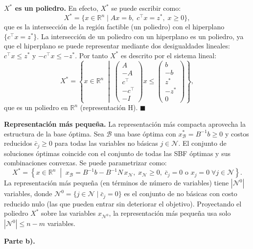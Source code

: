 \documentclass{article}
\begin{document}
\textbf{$X^*$ es un poliedro.} En efecto, $X^*$ se puede escribir como:
\[
X^* = \{x \in \mathbb{R}^n \mid Ax = b,\; c^\top x = z^*,\; x \geq 0\},
\]
que es la intersección de la región factible (un poliedro) con el hiperplano $\{c^\top x = z^*\}$. La intersección de un poliedro con un hiperplano es un poliedro, ya que el hiperplano se puede representar mediante dos desigualdades lineales: $c^\top x \leq z^*$ y $-c^\top x \leq -z^*$. Por tanto $X^*$ es descrito por el sistema lineal:
\[
X^* = \left\{x \in \mathbb{R}^n \;\middle|\; \begin{pmatrix} A \\ -A \\ c^\top \\ -c^\top \\ -I \end{pmatrix} x \leq \begin{pmatrix} b \\ -b \\ z^* \\ -z^* \\ 0 \end{pmatrix}\right\},
\]
que es un poliedro en $\mathbb{R}^n$ (representación H). $\blacksquare$

\textbf{Representación más pequeña.} La representación más compacta aprovecha la estructura de la base óptima. Sea $\mathcal{B}$ una base óptima con $x_\mathcal{B}^* = B^{-1}b \geq 0$ y costos reducidos $\bar{c}_j \geq 0$ para todas las variables no básicas $j \in \mathcal{N}$. El conjunto de soluciones óptimas coincide con el conjunto de todas las SBF óptimas y sus combinaciones convexas. Se puede parametrizar como:
\[
X^* = \left\{x \in \mathbb{R}^n \;\middle|\; x_\mathcal{B} = B^{-1}b - B^{-1}N\,x_\mathcal{N},\; x_\mathcal{N} \geq 0,\; \bar{c}_j = 0 \text{ o } x_j = 0\;\forall j \in \mathcal{N}\right\}.
\]
La representación más pequeña (en términos de número de variables) tiene $|\mathcal{N}^0|$ variables, donde $\mathcal{N}^0 = \{j \in \mathcal{N} \mid \bar{c}_j = 0\}$ es el conjunto de no básicas con costo reducido nulo (las que pueden entrar sin deteriorar el objetivo). Proyectando el poliedro $X^*$ sobre las variables $x_{\mathcal{N}^0}$, la representación más pequeña usa solo $|\mathcal{N}^0| \leq n - m$ variables.

\medskip
\noindent\textbf{Parte b).}
\end{document}
